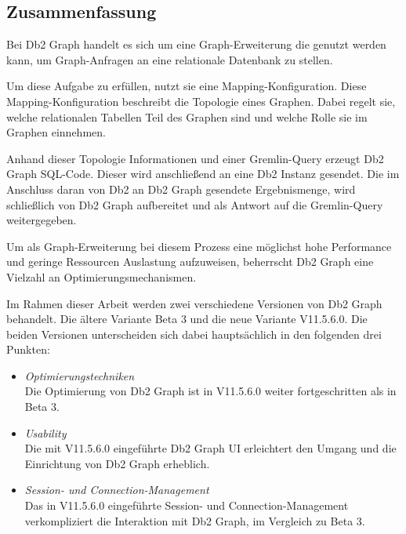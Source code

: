 \subsection{Zusammenfassung}

Bei Db2 Graph handelt es sich um eine Graph-Erweiterung die genutzt werden kann, um Graph-Anfragen an eine relationale Datenbank zu stellen. 

Um diese Aufgabe zu erfüllen, nutzt sie eine Mapping-Konfiguration. Diese Mapping-Konfiguration beschreibt die Topologie eines Graphen. Dabei regelt sie, welche relationalen Tabellen Teil des Graphen sind und welche Rolle sie im Graphen einnehmen.

Anhand dieser Topologie Informationen und einer Gremlin-Query erzeugt Db2 Graph SQL-Code. Dieser wird anschließend an eine Db2 Instanz gesendet. Die im Anschluss daran von Db2 an Db2 Graph gesendete Ergebnismenge, wird schließlich von Db2 Graph aufbereitet und als Antwort auf die Gremlin-Query weitergegeben. 

Um als Graph-Erweiterung bei diesem Prozess eine möglichst hohe Performance und geringe Ressourcen Auslastung aufzuweisen, beherrscht Db2 Graph eine Vielzahl an Optimierungsmechanismen. 

Im Rahmen dieser Arbeit werden zwei verschiedene Versionen von Db2 Graph behandelt. Die ältere Variante Beta 3 und die neue Variante V11.5.6.0. Die beiden Versionen unterscheiden sich dabei hauptsächlich in den folgenden drei Punkten:

\begin{itemize}
    \item \textit{Optimierungstechniken}\\
    Die Optimierung von Db2 Graph ist in V11.5.6.0 weiter fortgeschritten als in Beta 3. 
    \item \textit{Usability}\\
    Die mit V11.5.6.0 eingeführte Db2 Graph UI erleichtert den Umgang und die Einrichtung von Db2 Graph erheblich. 
    \item \textit{Session- und Connection-Management}\\
    Das in V11.5.6.0 eingeführte Session- und Connection-Management verkompliziert die Interaktion mit Db2 Graph, im Vergleich zu Beta 3.
\end{itemize}